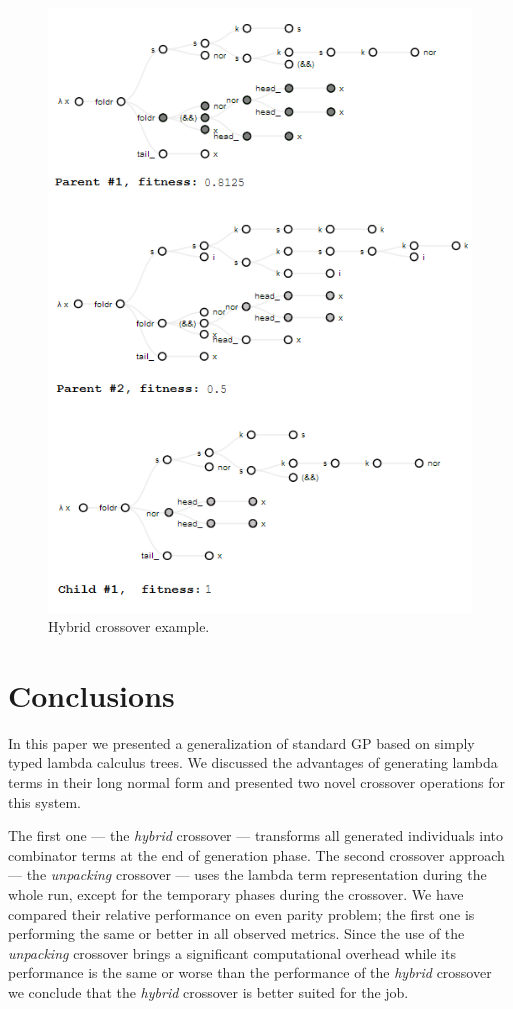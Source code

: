 \documentclass{sig-alternate}
\newcommand{\red}[1]{{\color{red} #1}}
\begin{document}
\begin{figure}[!ht]
  \centering
  \caption{Hybrid crossover example.}
  \includegraphics[scale=0.59]{crossover.png} %
\end{figure}


\section{Conclusions}
\label{conclusions}

In this paper we presented a generalization of standard GP based on simply typed lambda calculus trees. We discussed the advantages of generating lambda terms in their long normal form and presented two novel crossover operations for this system.

The first one --- the \textit{hybrid} crossover --- transforms all generated individuals into combinator terms at the end of generation phase. The second crossover approach --- the \textit{unpacking} crossover --- uses the lambda term representation during the whole run, except for the temporary phases during the crossover. We have compared their relative performance on even parity problem; the first one is performing the same or better in all observed metrics. Since the use of the \textit{unpacking} crossover brings a significant computational overhead while its performance is the same or worse than the performance of the \textit{hybrid} crossover we conclude that 
the \textit{hybrid} crossover is better suited for the job.
\end{document}
